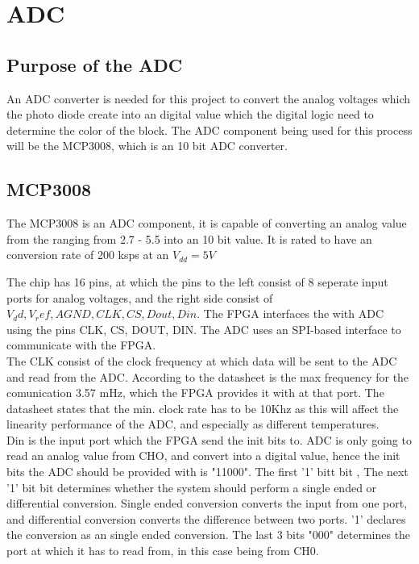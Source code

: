 \documentclass[10pt,a4paper]{article}
\begin{document}
\section{ADC}
\subsection{Purpose of the ADC}
An ADC converter is needed for this project to convert the analog voltages which the photo diode create into an digital value which the digital logic need to determine the color of the block.   
The ADC component being used for this process will be the MCP3008, which is an 10 bit ADC converter.  
\subsection{MCP3008}
The MCP3008 is an ADC component, it is capable of converting an analog value from the ranging from 2.7 - 5.5 into an 10 bit value. It is rated to have an conversion rate of 200 ksps at an $V_{dd} = 5V$


The chip has 16 pins, at which the pins to the left consist of 8 seperate input ports for analog voltages, and the right side consist of $V_dd, V_ref, AGND,CLK, CS, Dout, Din$.  The FPGA interfaces the with ADC using the pins CLK, CS, DOUT, DIN. 
The ADC uses an SPI-based interface to communicate with the FPGA. \\


The CLK consist of the clock frequency at which data will be sent to the ADC and read from the ADC. According to the datasheet is the max frequency for the comunication 3.57 mHz, which the FPGA provides it with at that port. The datasheet states that the min. clock rate has to be 10Khz as this will affect the linearity performance of the ADC,  and especially as different temperatures. \\


Din is the input port which the FPGA send the init bits to. 
ADC is only going to read an analog value from CHO, and convert into a digital value, hence the init bits the ADC should be provided with is "11000".  The first '1' bitt bit ,  The next '1' bit bit determines whether the system should perform a single ended or differential conversion. Single ended conversion converts the input from one port, and differential conversion converts the difference between two ports. '1' declares the conversion as an single ended conversion. The last 3 bits "000" determines the port at which it has to read from, in this case being from CH0.\\
  
\end{document}
